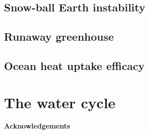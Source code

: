 \documentclass[12pt]{book}
\begin{document}
\section{Snow-ball Earth instability}
\section{Runaway greenhouse}
\section{Ocean heat uptake efficacy}

\chapter{The water cycle}









\newpage



\vspace{5 mm}
\noindent
{\bf Acknowledgements} 



\newpage
\end{document}
